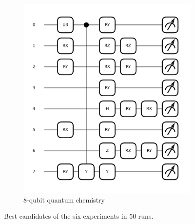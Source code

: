 \documentclass{article} %
\begin{document}
\begin{figure}[ht]
\begin{center}
\begin{subfigure}[b]{0.275\textwidth}
    \centering
    \includegraphics[width=\textwidth, height=0.75\textwidth]{images/best_candidate/8-qubits-vqe_best_candidate_75883.png}
    \caption{8-qubit quantum chemistry}
    \end{subfigure}
\end{center}
\caption{Best candidates of the six experiments in 50 runs.}
\label{best_candidates}
\end{figure}
\end{document}
